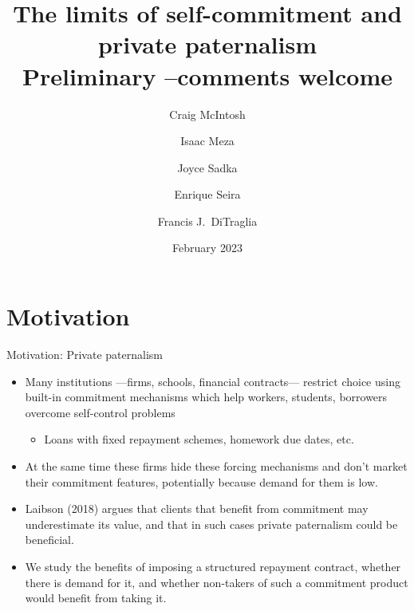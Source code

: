 \documentclass[8pt]{beamer}
\title{The limits of self-commitment and private paternalism \\
Preliminary --comments welcome}
\author{Craig McIntosh \and Isaac Meza \and Joyce Sadka \and Enrique Seira \and Francis J.\ DiTraglia }
\date{February 2023}
\begin{document}
\begin{frame}[c, noframenumbering]%
\titlepage
\end{frame}


\section{Motivation}



\begin{frame}{Motivation: Private paternalism}
\begin{itemize}
    \vfill \item Many institutions —firms, schools, financial contracts— restrict choice using built-in commitment mechanisms which help workers, students, borrowers overcome self-control problems
    \begin{itemize}
        \item Loans with fixed repayment schemes, homework due dates, etc.
    \end{itemize}
    \vfill \pause\item At the same time these firms hide these forcing mechanisms and don’t market their commitment features, potentially because demand for them is low.
    \vfill  \item  Laibson (2018) argues that clients that benefit from commitment may underestimate its value, and that in such cases private paternalism could be beneficial.
    \vfill  \pause\item  We study the benefits of imposing a structured repayment contract, whether there is demand for it, and whether non-takers of such a commitment product would benefit from taking it.
\end{itemize}

\end{frame}
\end{document}
